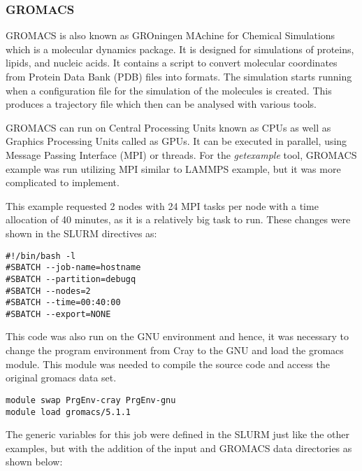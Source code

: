 \subsubsection{GROMACS}

GROMACS is also known as GROningen MAchine for Chemical Simulations which is a molecular dynamics package. It is designed for simulations of proteins, 
lipids, and nucleic acids. It contains a script to convert molecular coordinates from Protein Data Bank (PDB) files into formats. The simulation starts 
running when a configuration file for the simulation of the molecules is created. This produces a trajectory file which then can be analysed with various 
tools.

GROMACS can run on Central Processing Units known as CPUs as well as Graphics Processing Units called as GPUs. It can be executed in parallel, using 
Message Passing Interface (MPI) or threads. For the \emph{getexample} tool, GROMACS example was run utilizing MPI similar to LAMMPS example, but it was 
more complicated to implement.

This example requested 2 nodes with 24 MPI tasks per node with a time allocation of 40 minutes, as it is a relatively big task to run. These changes
were shown in the SLURM directives as:

\begin{tcolorbox}
\begin{Verbatim}[fontsize=\scriptsize]
#!/bin/bash -l
#SBATCH --job-name=hostname
#SBATCH --partition=debugq
#SBATCH --nodes=2
#SBATCH --time=00:40:00
#SBATCH --export=NONE
\end{Verbatim}
\end{tcolorbox}

This code was also run on the GNU environment and hence, it was necessary to change the program environment from Cray to the GNU and load the gromacs
module. This module was needed to compile the source code and access the original gromacs data set.

\begin{tcolorbox}
\begin{Verbatim}[fontsize=\scriptsize]
module swap PrgEnv-cray PrgEnv-gnu
module load gromacs/5.1.1
\end{Verbatim}
\end{tcolorbox}

The generic variables for this job were defined in the SLURM just like the other examples, but with the addition of the input and GROMACS data 
directories as shown below:

